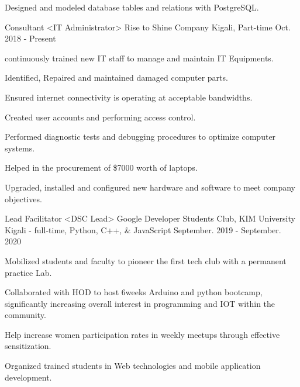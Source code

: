 \begin{cventries}
{\begin{cvitems}
        \item {Designed and modeled database tables and relations with PostgreSQL.}
      \end{cvitems}
    }
  \cventry
    {Consultant <IT Administrator>}
    {Rise to Shine Company}
    {Kigali, Part-time}
    {Oct. 2018 - Present}
    {
      \begin{cvitems}
        \item {continuously trained new IT staff to manage and maintain IT Equipments.}
        \item {Identified, Repaired and maintained damaged computer parts.}
        \item {Ensured internet connectivity is operating at acceptable bandwidths.}
        \item {Created user accounts and performing access control.}
        \item {Performed diagnostic tests and debugging procedures to optimize computer systems.}
        \item {Helped in the procurement of \$7000 worth of laptops.}
        \item {Upgraded, installed and configured new hardware and software to meet company objectives.}
      \end{cvitems}
    }
  \cventry
    {Lead Facilitator <DSC Lead>}
    {Google Developer Students Club, KIM University}
    {Kigali - full-time, Python, C++, \& JavaScript}
    {September. 2019 - September. 2020}
    {
      \begin{cvitems}
        \item{Mobilized students and faculty to pioneer the first tech club with a permanent practice Lab.}
        \item {Collaborated with HOD to host 6weeks Arduino and python bootcamp, significantly increasing overall interest in programming and IOT within the community.}
        \item {Help increase women participation rates in weekly meetups through effective sensitization.}
        \item {Organized trained students in Web technologies and mobile application development.}
      \end{cvitems}
    }
  \end{cventries}
